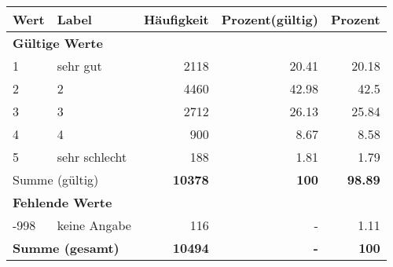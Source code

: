      \begin{longtable}{lXrrr}
     \toprule
     \textbf{Wert} & \textbf{Label} & \textbf{Häufigkeit} & \textbf{Prozent(gültig)} & \textbf{Prozent} \\
     \endhead
     \midrule
     \multicolumn{5}{l}{\textbf{Gültige Werte}}\\

     1 &
     \multicolumn{1}{X}{ sehr gut   } &


       \num{2118} &
       \num[round-mode=places,round-precision=2]{20.41} &
         \num[round-mode=places,round-precision=2]{20.18} \\

     2 &
     \multicolumn{1}{X}{ 2   } &


       \num{4460} &
       \num[round-mode=places,round-precision=2]{42.98} &
         \num[round-mode=places,round-precision=2]{42.5} \\

     3 &
     \multicolumn{1}{X}{ 3   } &


       \num{2712} &
       \num[round-mode=places,round-precision=2]{26.13} &
         \num[round-mode=places,round-precision=2]{25.84} \\

     4 &
     \multicolumn{1}{X}{ 4   } &


       \num{900} &
       \num[round-mode=places,round-precision=2]{8.67} &
         \num[round-mode=places,round-precision=2]{8.58} \\

     5 &
     \multicolumn{1}{X}{ sehr schlecht   } &


       \num{188} &
       \num[round-mode=places,round-precision=2]{1.81} &
         \num[round-mode=places,round-precision=2]{1.79} \\
     \midrule
     \multicolumn{2}{l}{Summe (gültig)} &
       \textbf{\num{10378}} &
     \textbf{\num{100}} &
       \textbf{\num[round-mode=places,round-precision=2]{98.89}} \\
     \multicolumn{5}{l}{\textbf{Fehlende Werte}}\\
       -998 &
       keine Angabe &
         \num{116} &
        - &
         \num[round-mode=places,round-precision=2]{1.11} \\
     \midrule
     \multicolumn{2}{l}{\textbf{Summe (gesamt)}} &
          \textbf{\num{10494}} &
        \textbf{-} &
        \textbf{\num{100}} \\
     \bottomrule
     \end{longtable}
     
